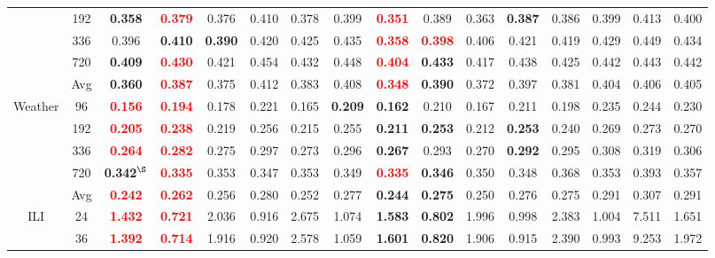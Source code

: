 \documentclass[a4paper,fleqn]{cas-sc}
\begin{document}
\begin{table}[t]
{\begin{tabular}{c|c|cc|cc|cc|cc|cc|cc|cc}
& 192 & \textbf{0.358} & \textbf{\textcolor{red}{0.379}} & 0.376 & 0.410 & 0.378 & 0.399 & \textbf{\textcolor{red}{0.351}} & 0.389 & 0.363 & \textbf{0.387} & 0.386 & 0.399 & 0.413 & 0.400 \\
& 336 & 0.396 & \textbf{0.410} & \textbf{0.390} & 0.420 & 0.425 & 0.435 & \textbf{\textcolor{red}{0.358}} & \textbf{\textcolor{red}{0.398}} & 0.406 & 0.421 & 0.419 & 0.429 & 0.449 & 0.434 \\
& 720 & \textbf{0.409} & \textbf{\textcolor{red}{0.430}} & 0.421 & 0.454 & 0.432 & 0.448 & \textbf{\textcolor{red}{0.404}} & \textbf{0.433} & 0.417 & 0.438 & 0.425 & 0.442 & 0.443 & 0.442 \\
& Avg & \textbf{0.360} & \textbf{\textcolor{red}{0.387}} & 0.375 & 0.412 & 0.383 & 0.408 & \textbf{\textcolor{red}{0.348}} & \textbf{0.390} & 0.372 & 0.397 & 0.381 & 0.404 & 0.406 & 0.405 \\
\midrule
\multirow{5}{*}{Weather}
& 96 & \textbf{\textcolor{red}{0.156}} & \textbf{\textcolor{red}{0.194}} & 0.178 & 0.221 & 0.165 & \textbf{0.209} & \textbf{0.162} & 0.210 & 0.167 & 0.211 & 0.198 & 0.235 & 0.244 & 0.230 \\
& 192 & \textbf{\textcolor{red}{0.205}} & \textbf{\textcolor{red}{0.238}} & 0.219 & 0.256 & 0.215 & 0.255 & \textbf{0.211} & \textbf{0.253} & 0.212 & \textbf{0.253} & 0.240 & 0.269 & 0.273 & 0.270 \\
& 336 & \textbf{\textcolor{red}{0.264}} & \textbf{\textcolor{red}{0.282}} & 0.275 & 0.297 & 0.273 & 0.296 & \textbf{0.267} & 0.293 & 0.270 & \textbf{0.292} & 0.295 & 0.308 & 0.319 & 0.306 \\
& 720 & \textbf{0.342$^\S$} & \textbf{\textcolor{red}{0.335}} & 0.353 & 0.347 & 0.353 & 0.349 & \textbf{\textcolor{red}{0.335}} & \textbf{0.346} & 0.350 & 0.348 & 0.368 & 0.353 & 0.393 & 0.357 \\
& Avg & \textbf{\textcolor{red}{0.242}} & \textbf{\textcolor{red}{0.262}} & 0.256 & 0.280 & 0.252 & 0.277 & \textbf{0.244} & \textbf{0.275} & 0.250 & 0.276 & 0.275 & 0.291 & 0.307 & 0.291 \\
\midrule
\multirow{5}{*}{ILI}
& 24 & \textbf{\textcolor{red}{1.432}} & \textbf{\textcolor{red}{0.721}} & 2.036 & 0.916 & 2.675 & 1.074 & \textbf{1.583} & \textbf{0.802} & 1.996 & 0.998 & 2.383 & 1.004 & 7.511 & 1.651 \\
& 36 & \textbf{\textcolor{red}{1.392}} & \textbf{\textcolor{red}{0.714}} & 1.916 & 0.920 & 2.578 & 1.059 & \textbf{1.601} & \textbf{0.820} & 1.906 & 0.915 & 2.390 & 0.993 & 9.253 & 1.972 \\

\end{tabular}}
\end{table}
\end{document}

